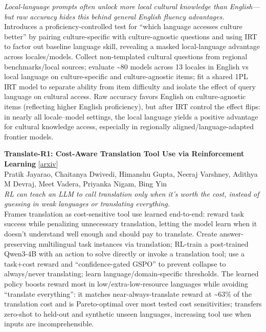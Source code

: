 \documentclass[12pt,letterpaper]{article}
\begin{document}
{\small\textit{Local-language prompts often unlock more local cultural knowledge than English---but raw accuracy hides this behind general English fluency advantages.}}\\[1pt]
{\footnotesize Introduces a proficiency-controlled test for ``which language accesses culture better'' by pairing culture-specific with culture-agnostic questions and using IRT to factor out baseline language skill, revealing a masked local-language advantage across locales/models. Collect non-templated cultural questions from regional benchmarks/local sources; evaluate \textasciitilde{}80 models across 13 locales in English vs local language on culture-specific and culture-agnostic items; fit a shared 1PL IRT model to separate ability from item difficulty and isolate the effect of query language on cultural access. Raw accuracy favors English on culture-agnostic items (reflecting higher English proficiency), but after IRT control the effect flips: in nearly all locale--model settings, the local language yields a positive advantage for cultural knowledge access, especially in regionally aligned/language-adapted frontier models.}

\medskip

{\small\textbf{Translate-R1: Cost-Aware Translation Tool Use via Reinforcement Learning}} {\scriptsize[\href{https://arxiv.org/abs/2606.06835}{arxiv}]}\\
{\scriptsize Pratik Jayarao, Chaitanya Dwivedi, Himanshu Gupta, Neeraj Varshney, Adithya M Devraj, Meet Vadera, Priyanka Nigam, Bing Yin}\\

{\small\textit{RL can teach an LLM to call translation only when it's worth the cost, instead of guessing in weak languages or translating everything.}}\\[1pt]
{\footnotesize Frames translation as cost-sensitive tool use learned end-to-end: reward task success while penalizing unnecessary translation, letting the model learn when it doesn't understand well enough and should pay to translate. Create answer-preserving multilingual task instances via translation; RL-train a post-trained Qwen3-4B with an action to solve directly or invoke a translation tool; use a task+cost reward and ``confidence-gated GSPO'' to prevent collapse to always/never translating; learn language/domain-specific thresholds. The learned policy boosts reward most in low/extra-low-resource languages while avoiding ``translate everything'': it matches near-always-translate reward at \textasciitilde{}63\% of the translation cost and is Pareto-optimal over most tested cost sensitivities; transfers zero-shot to held-out and synthetic unseen languages, increasing tool use when inputs are incomprehensible.}
\end{document}
